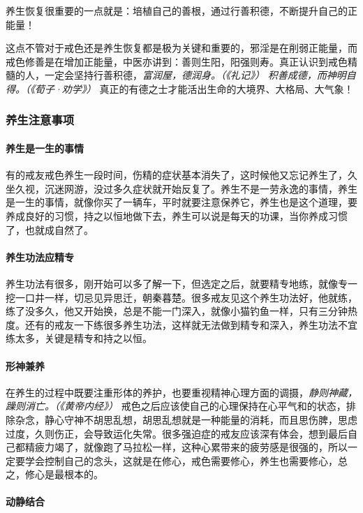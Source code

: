 养生恢复很重要的一点就是：培植自己的善根，通过行善积德，不断提升自己的正能量！

这点不管对于戒色还是养生恢复都是极为关键和重要的，邪淫是在削弱正能量，而戒色修善是在增加正能量，中医亦讲到：善则生阳，阳强则寿。真正认识到戒色精髓的人，一定会坚持行善积德，\textit{富润屋，德润身。（《礼记》）} \textit{积善成德，而神明自得。（《荀子·劝学》）} 真正的有德之士才能活出生命的大境界、大格局、大气象！

\subsubsection{养生注意事项}

\paragraph{养生是一生的事情}

有的戒友戒色养生一段时间，伤精的症状基本消失了，这时候他又忘记养生了，久坐久视，沉迷网游，没过多久症状就开始反复了。养生不是一劳永逸的事情，养生是一生的事情，就像你买了一辆车，平时就要注意保养它，养生也是这个道理，要养成良好的习惯，持之以恒地做下去，养生可以说是每天的功课，当你养成习惯了，也就成自然了。

\paragraph{养生功法应精专}

养生功法有很多，刚开始可以多了解一下，但选定之后，就要精专地练，就像专一挖一口井一样，切忌见异思迁，朝秦暮楚。很多戒友见这个养生功法好，他就练，练了没多久，他又开始换，总是不能一门深入，就像小猫钓鱼一样，只有三分钟热度。还有的戒友一下练很多养生功法，这样就无法做到精专和深入，养生功法不宜练太多，关键是精专和持之以恒。

\paragraph{形神兼养}

在养生的过程中既要注重形体的养护，也要重视精神心理方面的调摄，\textit{静则神藏，躁则消亡。（《黄帝内经》）} 戒色之后应该使自己的心理保持在心平气和的状态，排除杂念，静心守神不胡思乱想，胡思乱想就是一种能量的消耗，而且思伤脾，思虑过度，久则伤正，会导致运化失常。很多强迫症的戒友应该深有体会，想到最后自己都精疲力竭了，就像跑了马拉松一样，这种心累带来的疲劳感是很强的，所以一定要学会控制自己的念头，这就是在修心，戒色需要修心，养生也需要修心，总之，修心是最根本的。

\paragraph{动静结合}

